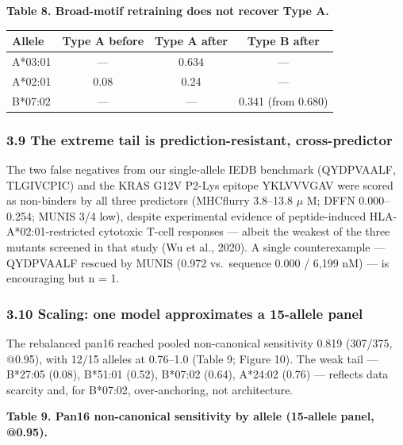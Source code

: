 \documentclass[10pt]{article}
\newcounter{none} %
\begin{document}
\textbf{Table 8. Broad-motif retraining does not recover Type A.}

{\def\LTcaptype{none} %
\begin{longtable}[]{@{}lccc@{}}
\toprule\noalign{}
Allele & Type A before & Type A after & Type B after \\
\midrule\noalign{}
\endhead
\bottomrule\noalign{}
\endlastfoot
A*03:01 & --- & 0.634 & --- \\
A*02:01 & 0.08 & 0.24 & --- \\
B*07:02 & --- & --- & 0.341 (from 0.680) \\
\end{longtable}
}

\subsubsection{3.9 The extreme tail is prediction-resistant,
cross-predictor}\label{the-extreme-tail-is-prediction-resistant-cross-predictor}

The two false negatives from our single-allele IEDB benchmark
(QYDPVAALF, TLGIVCPIC) and the KRAS G12V P2-Lys epitope YKLVVVGAV were
scored as non-binders by all three predictors (MHCflurry 3.8--13.8  $\mu$ M;
DFFN 0.000--0.254; MUNIS 3/4 low), despite experimental evidence of
peptide-induced HLA-A*02:01-restricted cytotoxic T-cell responses ---
albeit the weakest of the three mutants screened in that study (Wu et
al., 2020). A single counterexample --- QYDPVAALF rescued by MUNIS
(0.972 vs.~sequence 0.000 / 6,199 nM) --- is encouraging but n = 1.

\subsubsection{3.10 Scaling: one model approximates a 15-allele
panel}\label{scaling-one-model-approximates-a-15-allele-panel}

The rebalanced pan16 reached pooled non-canonical sensitivity 0.819
(307/375, @0.95), with 12/15 alleles at 0.76--1.0 (Table 9; Figure 10).
The weak tail --- B*27:05 (0.08), B*51:01 (0.52), B*07:02 (0.64),
A*24:02 (0.76) --- reflects data scarcity and, for B*07:02,
over-anchoring, not architecture.

\textbf{Table 9. Pan16 non-canonical sensitivity by allele (15-allele
panel, @0.95).}
\end{document}
